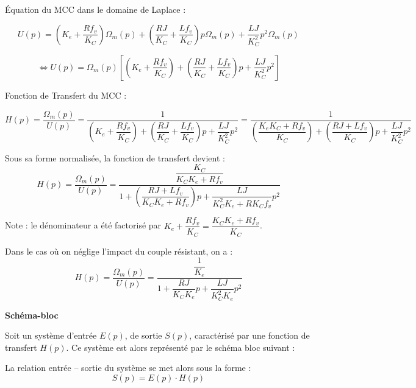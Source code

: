 \documentclass[11pt,oneside]{article}
\begin{document}
\begin{exemple}
Équation du MCC dans le domaine de Laplace :

$$
U(p)= 
 \left( K_e + \dfrac{R f_v}{K_C}\right) \Omega_m(p)
+\left( \dfrac{RJ}{K_C} + \dfrac{Lf_v}{K_C} \right) p \Omega_m(p)
+\dfrac{LJ}{K_C^2}  p^2 \Omega_m(p)
$$

$$ \Longleftrightarrow
U(p)= \Omega_m(p) \left[ 
 \left( K_e + \dfrac{R f_v}{K_C}\right) 
+\left( \dfrac{RJ}{K_C} + \dfrac{Lf_v}{K_C} \right) p 
+\dfrac{LJ}{K_C^2}  p^2 
\right]
$$


Fonction de Transfert du MCC :

$$
H(p)=\dfrac{\Omega_m(p)}{U(p)}
=\dfrac{1}{ \left( K_e + \dfrac{R f_v}{K_C}\right) 
+\left( \dfrac{RJ}{K_C} + \dfrac{Lf_v}{K_C} \right) p 
+\dfrac{LJ}{K_C^2}  p^2 }
=\dfrac{1}{ \left(  \dfrac{K_e K_C +R f_v}{K_C}\right) 
+\left( \dfrac{RJ+Lf_v}{K_C} \right) p 
+\dfrac{LJ}{K_C^2}  p^2 }
$$

Sous sa forme normalisée, la fonction de transfert devient : 
$$
H(p)=\dfrac{\Omega_m(p)}{U(p)}
=\dfrac{\dfrac{K_C}{K_C K_e + R f_v}}{ 1
+\left( \dfrac{RJ + Lf_v}{K_C K_e + R f_v} \right) p 
+\dfrac{LJ}{ K_C^2 K_e + RK_C f_v}  p^2 }
$$

Note : le dénominateur a été factorisé par $K_e + \dfrac{R f_v}{K_C} = \dfrac{K_C K_e + R f_v}{K_C} $.



Dans le cas où on néglige l'impact du couple résistant, on a :
$$
H(p)=\dfrac{\Omega_m(p)}{U(p)}
=\dfrac{
\dfrac{1}{K_e}}{ 1
+ \dfrac{RJ}{K_C K_e } p 
+\dfrac{LJ}{ K_C^2 K_e }  
p^2 }
$$

\end{exemple}

\begin{defi}
 \textbf{Schéma-bloc}

Soit un système d'entrée $E(p)$, de sortie $S(p)$, caractérisé par une fonction
de transfert $H(p)$. Ce système est alors représenté par le schéma bloc suivant
: 
\begin{center}
\end{center}

La relation entrée -- sortie du système se met alors sous la forme : 
$$
S(p) = E(p) \cdot H(p)
$$
\end{defi}
\end{document}
